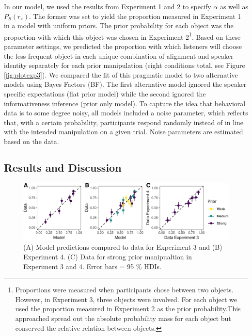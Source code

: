 \documentclass[10pt, letterpaper]{article}
\newenvironment{CodeChunk}{}{}
\begin{document}
In our model, we used the results from Experiment 1 and 2 to specify
\(\alpha\) as well as \(P_S(r_s)\). The former was set to yield the
proportion measured in Experiment 1 in a model with uniform priors. The
prior probability for each object was the proportion with which this
object was chosen in Experiment
2\footnote{Proportions were measured when participants chose between two objects. However, in Experiment 3, three objects were involved. For each object we used the proportion measured in Experiment 2 as the prior probability.This approached spread out the absolute probability mass for each object but conserved the relative relation between objects.}.
Based on these parameter settings, we predicted the proportion with
which listeners will choose the less frequent object in each unique
combination of alignment and speaker identity separately for each prior
manipulation (eight conditions total, see Figure \ref{fig:plotexp3}). We
compared the fit of this pragmatic model to two alternative models using
Bayes Factors (BF). The first alternative model ignored the speaker
specific expectations (flat prior model) while the second ignored the
informativeness inference (prior only model). To capture the idea that
behavioral data is to some degree noisy, all models included a noise
parameter, which reflects that, with a certain probability, participants
respond randomly instead of in line with the intended manipulation on a
given trial. Noise parameters are estimated based on the data.

\subsection{Results and Discussion}\label{results-and-discussion-2}

\begin{CodeChunk}
\begin{figure}[h]

{\centering \includegraphics{figs/plotmodelcomp-1} 

}

\caption[(A) Model predictions compared to data for Experiment 3 and (B) Experiment 4]{(A) Model predictions compared to data for Experiment 3 and (B) Experiment 4. (C) Data for strong prior manipualtion in Experiment 3 and 4. Error bars = 95 \%  HDIs.}\label{fig:plotmodelcomp}
\end{figure}
\end{CodeChunk}
\end{document}
